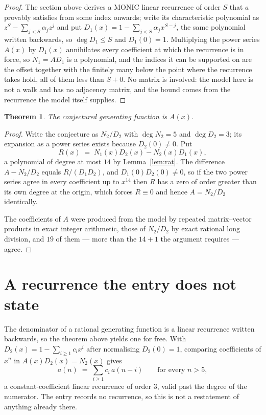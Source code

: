 \documentclass[11pt,a4paper]{article}
\theoremstyle{plain}
\newtheorem{theorem}{Theorem}
\theoremstyle{definition}
\begin{document}
\begin{proof}
The section above derives a MONIC linear recurrence of order $S$ that $a$ provably satisfies
from some index onwards; write its characteristic polynomial as $z^S-\sum_{j<S}\alpha_jz^j$
and put $D_1(x)=1-\sum_{j<S}\alpha_jx^{S-j}$, the same polynomial written backwards, so
$\deg D_1\le S$ and $D_1(0)=1$. Multiplying the power series $A(x)$ by $D_1(x)$ annihilates
every coefficient at which the recurrence is in force, so $N_1=AD_1$ is a polynomial, and the
indices it can be supported on are the offset together with the finitely many below the point
where the recurrence takes hold, all of them less than $S+0$. No matrix is involved: the
model here is not a walk and has no adjacency matrix, and the bound comes from the recurrence
the model itself supplies.
\end{proof}

\begin{theorem}
The conjectured generating function is $A(x)$.
\end{theorem}

\begin{proof}
Write the conjecture as $N_2/D_2$ with $\deg N_2=5$ and $\deg D_2=3$; its expansion as a
power series exists because $D_2(0)\neq0$. Put
\[
R(x)\;=\;N_1(x)D_2(x)-N_2(x)D_1(x),
\]
a polynomial of degree at most $14$ by Lemma~\ref{lem:rat}. The difference
$A-N_2/D_2$ equals $R/(D_1D_2)$, and $D_1(0)D_2(0)\neq0$, so if the two power series agree in
every coefficient up to $x^{14}$ then $R$ has a zero of order greater than its own
degree at the origin, which forces $R\equiv0$ and hence $A=N_2/D_2$ identically.

The coefficients of $A$ were produced from the model by repeated matrix--vector products in
exact integer arithmetic, those of $N_2/D_2$ by exact rational long division, and $19$
of them --- more than the $14+1$ the argument requires --- agree.
\end{proof}

\section{A recurrence the entry does not state}

The denominator of a rational generating function is a linear recurrence written backwards, so
the theorem above yields one for free. With $D_2(x)=1-\sum_{i\ge1}c_ix^i$ after normalising
$D_2(0)=1$, comparing coefficients of $x^n$ in $A(x)D_2(x)=N_2(x)$ gives
\[
a(n)\;=\;\sum_{i\ge1}c_i\,a(n-i)\qquad\text{for every }n>5,
\]
a constant-coefficient linear recurrence of order $3$, valid past the degree of the
numerator. The entry records no recurrence, so this is not a restatement of anything
already there.
\end{document}
